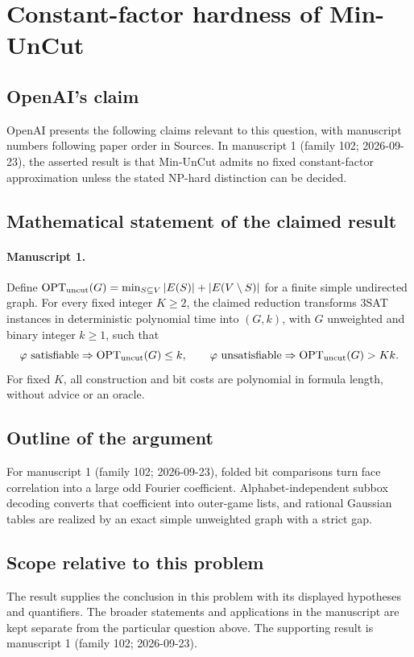 \documentclass[11pt]{article}
\begin{document}
\section*{Constant-factor hardness of Min-UnCut}

\subsection{OpenAI's claim}
OpenAI presents the following claims relevant to this question, with manuscript numbers following paper order in Sources. In manuscript 1 (family 102; 2026-09-23), the asserted result is that Min-UnCut admits no fixed constant-factor approximation unless the stated NP-hard distinction can be decided.

\subsection{Mathematical statement of the claimed result}
\paragraph{Manuscript 1.}
Define $\operatorname{OPT}_{\rm uncut}(G)=\min_{S\subseteq V}|E(S)|+|E(V\setminus S)|$ for a finite simple undirected graph. For every fixed integer $K\ge2$, the claimed reduction transforms $3$SAT instances in deterministic polynomial time into $(G,k)$, with $G$ unweighted and binary integer $k\ge1$, such that
\[
 \varphi\text{ satisfiable}\Rightarrow\operatorname{OPT}_{\rm uncut}(G)\le k,
 \qquad\varphi\text{ unsatisfiable}\Rightarrow\operatorname{OPT}_{\rm uncut}(G)>Kk.
\]
For fixed $K$, all construction and bit costs are polynomial in formula length, without advice or an oracle.

\subsection{Outline of the argument}
For manuscript 1 (family 102; 2026-09-23), folded bit comparisons turn face correlation into a large odd Fourier coefficient. Alphabet-independent subbox decoding converts that coefficient into outer-game lists, and rational Gaussian tables are realized by an exact simple unweighted graph with a strict gap.

\subsection{Scope relative to this problem}
The result supplies the conclusion in this problem with its displayed hypotheses and quantifiers. The broader statements and applications in the manuscript are kept separate from the particular question above. The supporting result is manuscript 1 (family 102; 2026-09-23).
\end{document}
